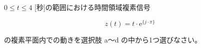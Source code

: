 $0 \leq t \leq 4$ [秒]の範囲における時間領域複素信号 

\[
z(t) = t \cdot \textrm{e}^{\{ j \cdot \pi \}}
\]

\medskip
\noindent の複素平面内での動きを選択肢 a〜d の中から1つ選びなさい。
